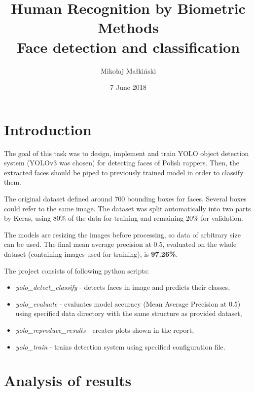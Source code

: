 \documentclass{article}
\title{
\textbf{Human Recognition by Biometric Methods}\\
\bigskip
\textbf{Face detection and classification}\\
\bigskip
}
\author{Mikołaj Małkiński}
\date{7 June 2018}
\begin{document}
    \maketitle

    \section{Introduction}\label{sec:introduction}

    The goal of this task was to design, implement and train YOLO object detection system (YOLOv3 was chosen) for detecting faces of Polish rappers.
    Then, the extracted faces should be piped to previously trained model in order to classify them.

    The original dataset defined around 700 bounding boxes for faces.
    Several boxes could refer to the same image.
    The dataset was split automatically into two parts by Keras, using 80\% of the data for training and remaining 20\% for validation.

    The models are resizing the images before processing, so data of arbitrary size can be used.
    The final mean average precision at 0.5, evaluated on the whole dataset (containing images used for training), is \textbf{97.26\%}.

    The project consists of following python scripts:
    \begin{itemize}
        \item \textit{yolo\_detect\_classify} - detects faces in image and predicts their classes,
        \item \textit{yolo\_evaluate} - evaluates model accuracy (Mean Average Precision at 0.5) using specified data directory with the same structure as provided dataset,
        \item \textit{yolo\_reproduce\_results} - creates plots shown in the report,
        \item \textit{yolo\_train} - trains detection system using specified configuration file.
    \end{itemize}

    \section{Analysis of results}\label{sec:analysisOfResults}
\end{document}
